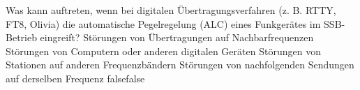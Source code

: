     {Was kann auftreten, wenn bei digitalen Übertragungsverfahren (z. B. RTTY, FT8, Olivia) die automatische Pegelregelung (ALC) eines Funkgerätes im SSB-Betrieb eingreift?}
    {Störungen von Übertragungen auf Nachbarfrequenzen}
    {Störungen von Computern oder anderen digitalen Geräten}
    {Störungen von Stationen auf anderen Frequenzbändern}
    {Störungen von nachfolgenden Sendungen auf derselben Frequenz}
    {false}{false}